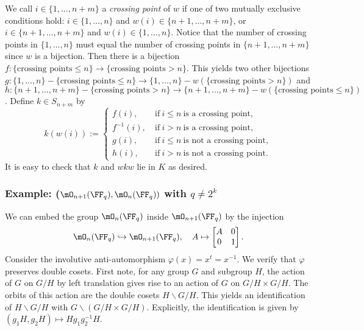 We call $i\in\{1,\ldots,n+m\}$ a \emph{crossing point} of $w$ if one of two mutually exclusive conditions hold: $i\in\{1,\ldots,n\}$ and $w(i)\in\{n+1,\ldots,n+m\}$, or $i\in\{n+1,\ldots,n+m\}$ and $w(i)\in\{1,\ldots,n\}$.
Notice that the number of crossing points in $\{1,\ldots,n\}$ must equal the number of crossing points in $\{n+1,\ldots,n+m\}$ since $w$ is a bijection.
Then there is a bijection $f\colon \{\text{crossing points}\leq n\} \to \{\text{crossing points}>n\}$.
This yields two other bijections $g\colon \{1,\ldots,n\}-\{\text{crossing points}\leq n\} \to \{1,\ldots,n\}-w(\{\text{crossing points}>n\})$ and $h\colon \{n+1,\ldots,n+m\}-\{\text{crossing points}>n\} \to \{n+1,\ldots,n+m\} - w(\{\text{crossing points}\leq n\})$. Define $k\in S_{n+m}$ by
\[
    k(w(i)) := \begin{cases}
        f(i),\       & \text{if}\ i\leq n\ \text{is a crossing point},     \\
        f^{-1}(i),\  & \text{if}\ i>n\ \text{is a crossing point},         \\
        g(i),\       & \text{if}\ i\leq n\ \text{is not a crossing point}, \\
        h(i),\       & \text{if}\ i> n\ \text{is not a crossing point}.
    \end{cases}
\]
It is easy to check that $k$ and $wkw$ lie in $K$ as desired.

\subsubsection{Example: ($\mO_{n+1}(\FF_q),\mO_n(\FF_q))$ with $q\neq 2^k$}
We can embed the group $\mO_n(\FF_q)$ inside $\mO_{n+1}(\FF_q)$ by the injection
\[
    \mO_n(\FF_q) \hookrightarrow \mO_{n+1}(\FF_q),\quad A \mapsto \begin{bmatrix} A & 0 \\ 0 & 1 \end{bmatrix}.
\]
Consider the involutive anti-automorphism $\varphi(x)=x^t=x^{-1}$.
We verify that $\varphi$ preserves double cosets.
First note, for any group $G$ and subgroup $H$, the action of $G$ on $G/H$ by left translation gives rise to an action of $G$ on $G/H\times G/H$.
The orbits of this action are the double cosets $H\backslash G/H$.
This yields an identification of $H\backslash G/H$ with $G\backslash (G/H\times G/H)$.
Explicitly, the identification is given by $(g_1H,g_2H)\mapsto Hg_1g_2^{-1}H$.


